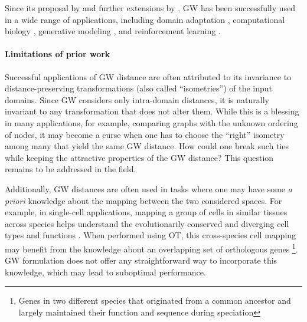 Since its proposal by \citep{Memoli11} and further extensions by \citep{Peyre16},
GW has been successfully used in a wide range of applications, including
domain adaptation \citep{Yan18}, computational biology
\citep{Nitzan2019,Pamona,UniPort,SpaOTsc,Demetci20,Demetci22,PASTE},
generative modeling \citep{Bunne19}, and reinforcement learning \citep{GW-VAE}.

\paragraph{Limitations of prior work} Successful applications of GW distance are often
attributed to its invariance to distance-preserving transformations (also called ``isometries'')
of the input domains. Since GW considers only intra-domain distances, it is naturally invariant
to any transformation that does not alter them. While this is a blessing in many applications,
for example, comparing graphs with the unknown ordering of nodes, it may become a curse
when one has to choose the ``right'' isometry among many that yield the same GW distance.
How could one break such ties while keeping the attractive properties of the GW distance?
This question remains to be addressed in the field.

Additionally, GW distances are often used in tasks where one may have some
\textit{a priori} knowledge about the mapping between the two considered spaces.
For example, in single-cell applications, mapping a group of cells in similar tissues
across species helps understand the evolutionarily conserved and diverging cell types
and functions \citep{kriebel2022uinmf}. When performed using OT, this cross-species cell mapping
may benefit from the knowledge about an overlapping set of orthologous genes
\footnote {Genes in two different species that originated from a common ancestor and
largely maintained their function and sequence during speciation}.
GW formulation does not offer any straightforward way to incorporate this knowledge,
which may lead to suboptimal performance.

